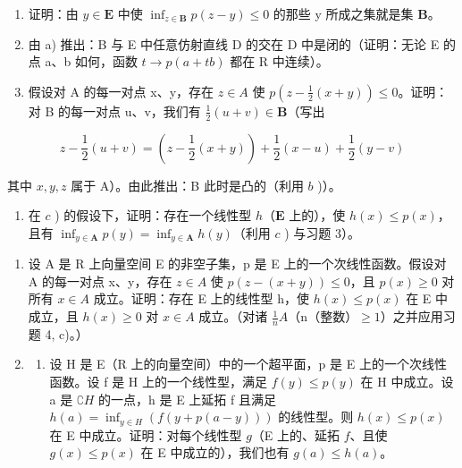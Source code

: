 \begin{enumerate}
\def\labelenumi{\alph{enumi})}
\item
  证明：由 \(y \in \mathbf{E}\) 中使 \(\inf_{z \in \mathbf{B}} p(z - y) \leqslant 0\) 的那些 y 所成之集就是集 \(\mathbf{B}\)。
\item
  由 a) 推出：B 与 E 中任意仿射直线 D 的交在 D 中是闭的（证明：无论 E 的点 a、b 如何，函数 \(t \rightarrow p(a + tb)\) 都在 R 中连续）。
\item
  假设对 A 的每一对点 x、y，存在 \(z \in A\) 使 \(p(z - \frac{1}{2}(x + y)) \leqslant 0\)。证明：对 B 的每一对点 u、v，我们有 \(\frac{1}{2}(u + v) \in \mathbf{B}\)（写出
\end{enumerate}

\[
z - \frac {1}{2} (u + v) = \left(z - \frac {1}{2} (x + y)\right) + \frac {1}{2} (x - u) + \frac {1}{2} (y - v)
\]

其中 \(x, y, z\) 属于 A）。由此推出：B 此时是凸的（利用 \(b\) )）。

\begin{enumerate}
\def\labelenumi{\alph{enumi})}
\setcounter{enumi}{3}
\tightlist
\item
  在 \(c\) ) 的假设下，证明：存在一个线性型 \(h\)（\(\mathbf{E}\) 上的），使 \(h(x) \leqslant p(x)\)，且有 \(\inf_{y \in \mathbf{A}} p(y) = \inf_{y \in \mathbf{A}} h(y)\)（利用 \(c\) ) 与习题 3）。
\end{enumerate}

\begin{enumerate}
\def\labelenumi{\arabic{enumi})}
\setcounter{enumi}{4}
\item
  设 A 是 R 上向量空间 E 的非空子集，p 是 E 上的一个次线性函数。假设对 A 的每一对点 x、y，存在 \(z \in A\) 使 \(p(z - (x + y)) \leqslant 0\)，且 \(p(x) \geqslant 0\) 对所有 \(x \in A\) 成立。证明：存在 E 上的线性型 h，使 \(h(x) \leqslant p(x)\) 在 E 中成立，且 \(h(x) \geqslant 0\) 对 \(x \in A\) 成立。（对诸 \(\frac{1}{n}A\)（n（整数）\(\geqslant 1\)）之并应用习题 4, c)。）
\item
  \begin{enumerate}
  \def\labelenumii{\alph{enumii})}
  \tightlist
  \item
    设 H 是 E（R 上的向量空间）中的一个超平面，p 是 E 上的一个次线性函数。设 f 是 H 上的一个线性型，满足 \(f(y) \leqslant p(y)\) 在 H 中成立。设 a 是 \(\complement H\) 的一点，h 是 E 上延拓 f 且满足 \(h(a) = \inf_{y \in H} (f(y + p(a - y)))\) 的线性型。则 \(h(x) \leqslant p(x)\) 在 E 中成立。证明：对每个线性型 \(g\)（E 上的、延拓 \(f\)、且使 \(g(x) \leqslant p(x)\) 在 E 中成立的），我们也有 \(g(a) \leqslant h(a)\)。
  \end{enumerate}
\end{enumerate}

